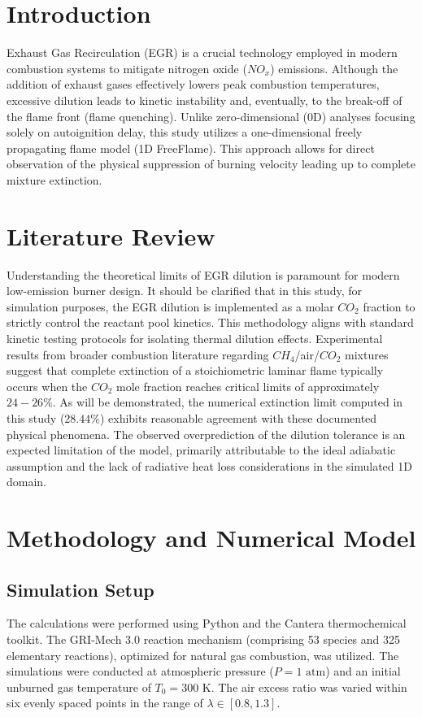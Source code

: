 \documentclass[11pt,a4paper]{article}
\begin{document}
\section{Introduction}
Exhaust Gas Recirculation (EGR) is a crucial technology employed in modern combustion systems to mitigate nitrogen oxide ($NO_x$) emissions. Although the addition of exhaust gases effectively lowers peak combustion temperatures, excessive dilution leads to kinetic instability and, eventually, to the break-off of the flame front (flame quenching). Unlike zero-dimensional (0D) analyses focusing solely on autoignition delay, this study utilizes a one-dimensional freely propagating flame model (1D FreeFlame). This approach allows for direct observation of the physical suppression of burning velocity leading up to complete mixture extinction.

\vspace{1cm}
\section{Literature Review}
Understanding the theoretical limits of EGR dilution is paramount for modern low-emission burner design. It should be clarified that in this study, for simulation purposes, the EGR dilution is implemented as a molar $CO_2$ fraction to strictly control the reactant pool kinetics. This methodology aligns with standard kinetic testing protocols for isolating thermal dilution effects. Experimental results from broader combustion literature regarding $CH_4$/air/$CO_2$ mixtures suggest that complete extinction of a stoichiometric laminar flame typically occurs when the $CO_2$ mole fraction reaches critical limits of approximately $24-26\%$. As will be demonstrated, the numerical extinction limit computed in this study ($28.44\%$) exhibits reasonable agreement with these documented physical phenomena. The observed overprediction of the dilution tolerance is an expected limitation of the model, primarily attributable to the ideal adiabatic assumption and the lack of radiative heat loss considerations in the simulated 1D domain.
\newpage
\section{Methodology and Numerical Model}

\subsection{Simulation Setup}
The calculations were performed using Python and the Cantera thermochemical toolkit. The GRI-Mech 3.0 reaction mechanism (comprising 53 species and 325 elementary reactions), optimized for natural gas combustion, was utilized. The simulations were conducted at atmospheric pressure ($P = 1 \text{ atm}$) and an initial unburned gas temperature of $T_0 = 300 \text{ K}$. The air excess ratio was varied within six evenly spaced points in the range of $\lambda \in [0.8, 1.3]$.
\vspace{1cm}
\end{document}
